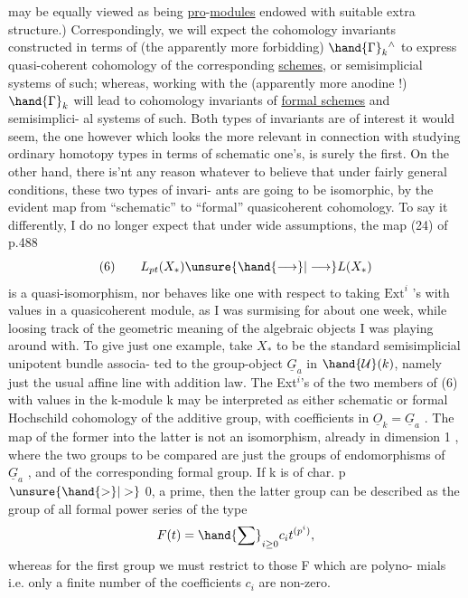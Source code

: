 
may be equally viewed as being \uline{pro}-\uline{modules} endowed with suitable extra
structure.) Correspondingly, we will expect the cohomology invariants
constructed in terms of (the apparently more forbidding) $\hand{\Gamma}_k{}^{\wedge}$ to express
quasi-coherent cohomology of the corresponding \uline{schemes}, or semisimplicial
systems of such; whereas, working with the (apparently more anodine !)
$\hand{\Gamma}_k$ will lead to cohomology invariants of \uline{formal schemes} and semisimplici-%
al systems of such. Both types of invariants are of interest it would
seem, the one however which looks the more relevant in connection with
studying ordinary homotopy types in terms of schematic one's, is surely
the first. On the other hand, there is'nt any reason whatever to
believe that under fairly general conditions, these two types of invari-%
ants are going to be isomorphic, by the evident map from ``schematic'' to
``formal'' quasicoherent cohomology. To say it differently, I do no longer
expect that under wide assumptions, the map (24) of p.488
\[
(6)\qquad L_{pt}(X_{*})\unsure{\hand{\longrightarrow}|\longrightarrow} L(X_{*})
\]
is a quasi-isomorphism, nor behaves like one with respect to taking
$\mathrm{Ext}^{i}$ 's with values in a quasicoherent module, as I was  surmising for
about one week, while loosing track of the geometric meaning of the
algebraic objects I was playing around with. To give just one example,
take $X_{*}$ to be the standard semisimplicial  unipotent bundle associa-%
ted to the group-object $\underline{G}_a$ in $\hand{\mathcal{U}}(k)$, namely just the usual affine line
with addition law. The Ext$^{i}$'s of the two members of (6) with values in
the k-module k may be interpreted as either schematic or formal Hochschild
cohomology of the additive group, with coefficients in  $\underline{O}_k = \underline{G}_a$ .
The map of the former into the latter is not  an isomorphism, already
in dimension 1 , where the two groups to be compared are just the groups
of endomorphisms of $\underline{G}_a$ , and of the corresponding formal group. If k is
of char. p $\unsure{\hand{>}|>}$ 0, a prime, then the latter group can be described as the
group of all formal power series of the type
\[
F(t) = \hand{\sum}_{i\geq 0} c_i t^{(p^{i})} ,
\]
whereas for the first group we must restrict to those F which are polyno-%
mials i.e.  only a finite number of the coefficients $c_i$ are non-zero.

